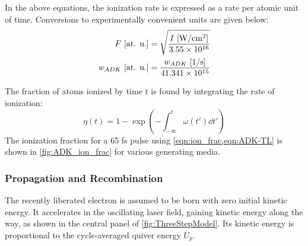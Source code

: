 In the above equations, the ionization rate is expressed as a rate per atomic unit of time. Conversions to experimentally convenient units are given below:
\begin{align}
F \textrm{ [at. u.]} &= \sqrt{\frac{ I \textrm{ [W/cm\textsuperscript{2}]}}{3.55 \times 10^{16}}} \\
w_{ADK} \textrm{  [at. u.]} &= \frac{w_{ADK} \textrm{ [1/s]}}{41.341 \times 10^{15}}
\end{align}

The fraction of atoms ionized by time $t$ is found by integrating the rate of ionization:
\begin{equation}
\eta(t) = 1 - \exp \left( - \int_{-\infty}^{t} \omega(t') \dd{t'} \right)
\label{eqn:ion_frac}
\end{equation}
The ionization fraction for a 65 fs pulse using \cref{eqn:ion_frac,eqn:ADK-TL} is shown in \cref{fig:ADK_ion_frac} for various generating media.

\subsubsection{Propagation and Recombination}
\label{sec:HHG_propagation_recombination}

The recently liberated electron is assumed to be born with zero initial kinetic energy. It accelerates in the oscillating laser field, gaining kinetic energy along the way, as shown in the central panel of \cref{fig:ThreeStepModel}. Its kinetic energy is proportional to the cycle-averaged quiver energy $U_p$.

